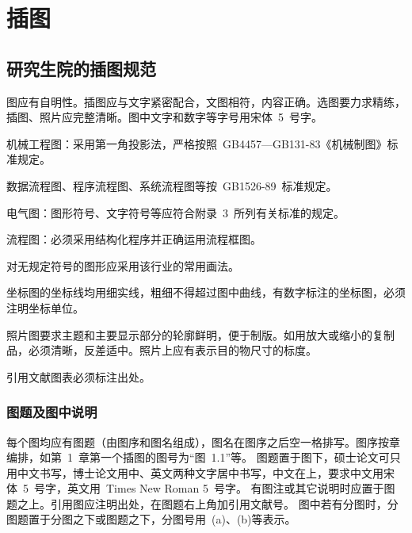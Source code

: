 
%
%
%

\chapter{插图}
\label{chap05}

\section{研究生院的插图规范}

图应有自明性。插图应与文字紧密配合，文图相符，内容正确。选图要力求精练，插图、照片应完整清晰。图中文字和数字等字号用宋体~5~号字。

机械工程图：采用第一角投影法，严格按照~GB4457---GB131-83《机械制图》标准规定。

数据流程图、程序流程图、系统流程图等按~GB1526-89~标准规定。

电气图：图形符号、文字符号等应符合附录~3~所列有关标准的规定。

流程图：必须采用结构化程序并正确运用流程框图。

对无规定符号的图形应采用该行业的常用画法。

坐标图的坐标线均用细实线，粗细不得超过图中曲线，有数字标注的坐标图，必须注明坐标单位。

照片图要求主题和主要显示部分的轮廓鲜明，便于制版。如用放大或缩小的复制品，必须清晰，反差适中。照片上应有表示目的物尺寸的标度。

引用文献图表必须标注出处。


\subsection{图题及图中说明}

每个图均应有图题（由图序和图名组成），图名在图序之后空一格排写。图序按章编排，如第~1~章第一个插图的图号为“图~1.1”等。
图题置于图下，硕士论文可只用中文书写，博士论文用中、英文两种文字居中书写，中文在上，要求中文用宋体~5~号字，英文用~Times New Roman 5~号字。
有图注或其它说明时应置于图题之上。引用图应注明出处，在图题右上角加引用文献号。
图中若有分图时，分图题置于分图之下或图题之下，分图号用~(a)、(b)等表示。


